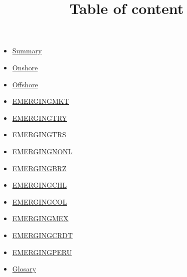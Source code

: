 \documentclass{article}
\title{Table of content}
\begin{document}
\maketitle

\begin{itemize}
    \item \hyperlink{page.2}{Summary}
    \item \hyperlink{page.3}{Onshore}
    \item \hyperlink{page.4}{Offshore}
    \item \hyperlink{page.5}{EMERGINGMKT}
    \item \hyperlink{page.6}{EMERGINGTRY}
    \item \hyperlink{page.7}{EMERGINGTRS}
    \item \hyperlink{page.8}{EMERGINGNONL}
    \item \hyperlink{page.9}{EMERGINGBRZ}
    \item \hyperlink{page.10}{EMERGINGCHL}
    \item \hyperlink{page.11}{EMERGINGCOL}
    \item \hyperlink{page.12}{EMERGINGMEX}
    \item \hyperlink{page.13}{EMERGINGCRDT}
    \item \hyperlink{page.14}{EMERGINGPERU}
    \item \hyperlink{page.15}{Glosary}
\end{itemize}


\end{document}
